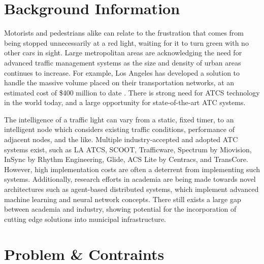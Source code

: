 \documentclass[a4paper,11pt]{article}
\begin{document}
\begin{multicols}{2}
\section{Background Information}
Motorists and pedestrians alike can relate to the frustration that comes from being stopped unnecessarily at a red light, waiting for it to turn green with no other cars in sight.
Large metropolitan areas are acknowledging the need for advanced traffic management systems as the size and density of urban areas continues to increase.
For example, Los Angeles has developed a solution to handle the massive volume placed on their transportation networks, at an estimated cost of \$400 million to date \cite{la-atcs-article}.
There is strong need for ATCS technology in the world today, and a large opportunity for state-of-the-art ATC systems.

The intelligence of a traffic light can vary from a static, fixed timer, to an intelligent node which considers existing traffic conditions, performance of adjacent nodes, and the like.
Multiple industry-accepted and adopted ATC systems exist, such as LA ATCS, SCOOT, Trafficware, Spectrum by Miovision, InSync by Rhythm Engineering, Glide, ACS Lite by Centracs, and TransCore.
However, high implementation costs are often a deterrent from implementing such systems.
Additionally, research efforts in academia are being made towards novel architectures such as agent-based distributed systems, which implement advanced machine learning and neural network concepts\cite{1688100, 5073360, uot-article}.
There still exists a large gap between academia and industry, showing potential for the incorporation of cutting edge solutions into municipal infrastructure.


\section{Problem \& Contraints}


\end{multicols}
\end{document}
